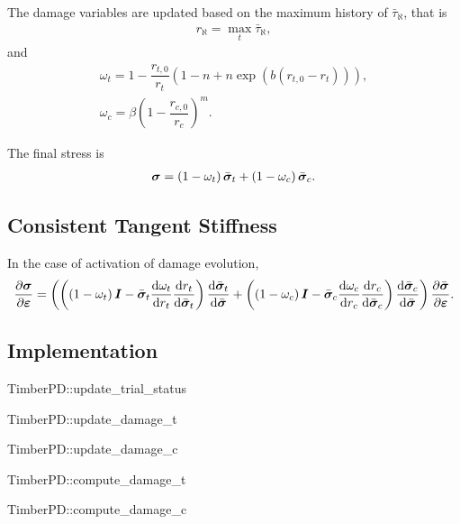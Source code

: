 The damage variables are updated based on the maximum history of $\bar{\tau}_{\aleph}$, that is
\begin{gather}
r_\aleph=\max_t\bar{\tau}_{\aleph},
\end{gather}
and
\begin{gather}
\omega_t=1-\dfrac{r_{t,0}}{r_t}\left(1-n+n\exp\left(b\left(r_{t,0}-r_t\right)\right)\right),\\
\omega_c=\beta\left(1-\dfrac{r_{c,0}}{r_c}\right)^m.
\end{gather}

The final stress is
\begin{gather}
\bm{\sigma}=\left(1-\omega_t\right)\bar{\bm{\sigma}}_t+\left(1-\omega_c\right)\bar{\bm{\sigma}}_c.
\end{gather}
\subsection{Consistent Tangent Stiffness}
In the case of activation of damage evolution,
\begin{gather}
\dfrac{\partial{\bm{\sigma}}}{\partial{\bm{\varepsilon}}}=\left(\left(\left(1-\omega_t\right)\bm{I}-\bar{\bm{\sigma}}_t\dfrac{\mathrm{d}\omega_t}{\mathrm{d}r_t}\dfrac{\mathrm{d}r_t}{\mathrm{d}\bar{\bm{\sigma}}_t}\right)\dfrac{\mathrm{d}\bar{\bm{\sigma}}_t}{\mathrm{d}\bar{\bm{\sigma}}}
+\left(\left(1-\omega_c\right)\bm{I}-\bar{\bm{\sigma}}_c\dfrac{\mathrm{d}\omega_c}{\mathrm{d}r_c}\dfrac{\mathrm{d}r_c}{\mathrm{d}\bar{\bm{\sigma}}_c}\right)\dfrac{\mathrm{d}\bar{\bm{\sigma}}_c}{\mathrm{d}\bar{\bm{\sigma}}}\right)\dfrac{\partial{\bar{\bm{\sigma}}}}{\partial{\bm{\varepsilon}}}.
\end{gather}
\subsection{Implementation}
\begin{cppcode}
TimberPD::update_trial_status
\end{cppcode}

\begin{cppcode}
    TimberPD::update_damage_t
\end{cppcode}

\begin{cppcode}
    TimberPD::update_damage_c
\end{cppcode}

\begin{cppcode}
    TimberPD::compute_damage_t
\end{cppcode}

\begin{cppcode}
TimberPD::compute_damage_c
\end{cppcode}